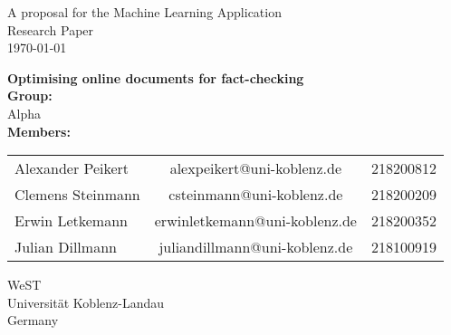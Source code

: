 \documentclass[10pt]{article}
\begin{document}
\begin{titlepage}
\begin{center}


A proposal for the Machine Learning Application\\
Research Paper\\
\vspace{4mm}
\today
\vspace{4mm}
\end{center}
\begin{center}
\textbf{\Large Optimising online documents for fact-checking}\\
\vspace{15mm}
\textbf{Group:}\\
\vspace{2mm}
Alpha \\
\vspace{15mm}
\textbf {Members:}\\
\vspace{2mm}
\end{center}
\begin{tabular}{ l c r }
  Alexander Peikert & alexpeikert@uni-koblenz.de & 218200812 \\
  Clemens Steinmann & csteinmann@uni-koblenz.de & 218200209 \\
  Erwin Letkemann & erwinletkemann@uni-koblenz.de & 218200352 \\
  Julian Dillmann & juliandillmann@uni-koblenz.de & 218100919 \\
\end{tabular}
\vfill
\begin{center}
\vspace{8mm}
WeST \\
Universität Koblenz-Landau \\
Germany \\
\vspace{2mm}
\end{center}
\clearpage
\end{titlepage}
\end{document}
